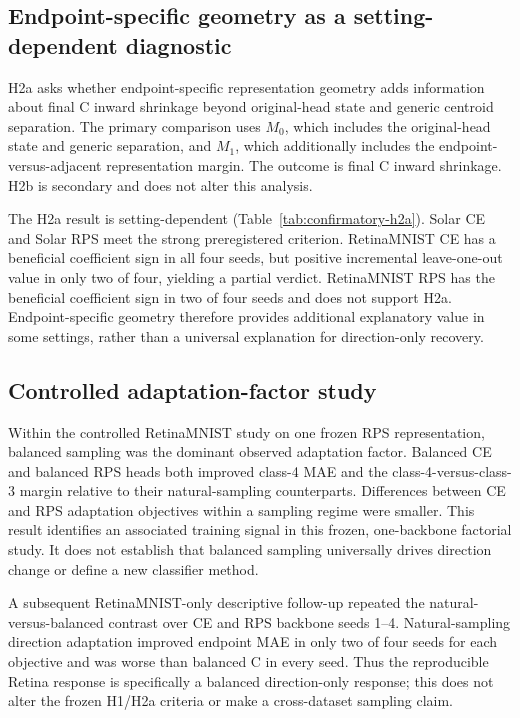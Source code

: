 

\subsection{Endpoint-specific geometry as a setting-dependent diagnostic}
\label{sec:results-h2a}

H2a asks whether endpoint-specific representation geometry adds information
about final C inward shrinkage beyond original-head state and generic centroid
separation. The primary comparison uses $M_0$, which includes the original-head
state and generic separation, and $M_1$, which additionally includes the
endpoint-versus-adjacent representation margin. The outcome is final C inward
shrinkage. H2b is secondary and does not alter this analysis.

The H2a result is setting-dependent (Table~\ref{tab:confirmatory-h2a}). Solar
CE and Solar RPS meet the strong preregistered criterion. RetinaMNIST CE has a
beneficial coefficient sign in all four seeds, but positive incremental
leave-one-out value in only two of four, yielding a partial verdict.
RetinaMNIST RPS has the beneficial coefficient sign in two of four seeds and
does not support H2a. Endpoint-specific geometry therefore provides additional
explanatory value in some settings, rather than a universal explanation for
direction-only recovery.



\subsection{Controlled adaptation-factor study}
\label{sec:results-factorial}

Within the controlled RetinaMNIST study on one frozen RPS representation,
balanced sampling was the dominant observed adaptation factor. Balanced CE and
balanced RPS heads both improved class-4 MAE and the class-4-versus-class-3
margin relative to their natural-sampling counterparts. Differences between CE
and RPS adaptation objectives within a sampling regime were smaller. This
result identifies an associated training signal in this frozen, one-backbone
factorial study. It does not establish that balanced sampling universally drives
direction change or define a new classifier method.

A subsequent RetinaMNIST-only descriptive follow-up repeated the natural-
versus-balanced contrast over CE and RPS backbone seeds 1--4. Natural-sampling
direction adaptation improved endpoint MAE in only two of four seeds for each
objective and was worse than balanced C in every seed. Thus the reproducible
Retina response is specifically a balanced direction-only response; this does
not alter the frozen H1/H2a criteria or make a cross-dataset sampling claim.

